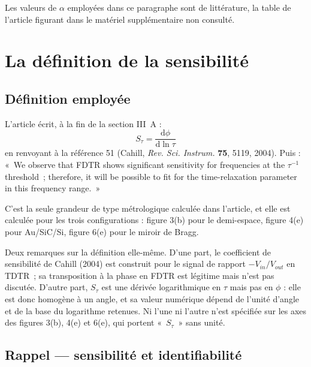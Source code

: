 \documentclass[11pt,a4paper]{article}
\begin{document}
Les valeurs de $\alpha$ employées dans ce paragraphe sont de littérature, la table de l'article
figurant dans le matériel supplémentaire non consulté.

\section{La définition de la sensibilité}

\subsection{Définition employée}

L'article écrit, à la fin de la section III~A :
\[
S_\tau = \frac{\mathrm{d}\phi}{\mathrm{d}\ln\tau}
\]
en renvoyant à la référence 51 (Cahill, \textit{Rev. Sci. Instrum.} \textbf{75}, 5119, 2004).
Puis : «~We observe that FDTR shows significant sensitivity for frequencies at the $\tau^{-1}$
threshold~; therefore, it will be possible to fit for the time-relaxation parameter in this
frequency range.~»

C'est la seule grandeur de type métrologique calculée dans l'article, et elle est calculée pour
les trois configurations : figure 3(b) pour le demi-espace, figure 4(e) pour Au/SiC/Si,
figure 6(e) pour le miroir de Bragg.

Deux remarques sur la définition elle-même. D'une part, le coefficient de sensibilité de
Cahill (2004) est construit pour le signal de rapport $-V_{in}/V_{out}$ en TDTR~; sa
transposition à la phase en FDTR est légitime mais n'est pas discutée. D'autre part, $S_\tau$
est une dérivée logarithmique en $\tau$ mais pas en $\phi$ : elle est donc homogène à un angle,
et sa valeur numérique dépend de l'unité d'angle et de la base du logarithme retenues. Ni l'une
ni l'autre n'est spécifiée sur les axes des figures 3(b), 4(e) et 6(e), qui portent
«~$S_\tau$~» sans unité.

\subsection{Rappel --- sensibilité et identifiabilité}
\end{document}
